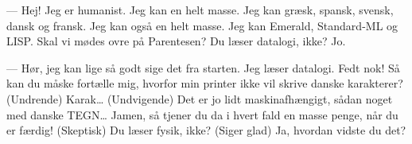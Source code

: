 \documentclass[10pt]{article}
\begin{document}
\begin{sketch}
---
Hej! Jeg er humanist. Jeg kan en helt masse. Jeg kan græsk,
spansk, svensk, dansk og fransk. 
Jeg kan også en helt masse. Jeg kan Emerald, Standard-ML
og LISP. Skal vi mødes ovre på Parentesen?
 Du læser datalogi, ikke?
  Jo.

---
Hør, jeg kan lige så godt sige det fra starten. Jeg læser datalogi.
Fedt nok! Så kan du måske fortælle mig, hvorfor min printer ikke vil
skrive danske karakterer?
 (Undrende) Karak\ldots {} (Undvigende) Det er jo lidt maskinafhængigt, sådan noget med danske 
TEGN\ldots
{}  Jamen, så tjener du da i hvert fald en masse penge, når du er færdig!
(Skeptisk) Du læser fysik, ikke?
 (Siger glad) Ja, hvordan vidste du det?
\end{sketch}
\end{document}
